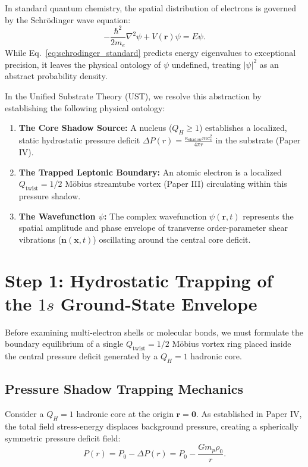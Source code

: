 \documentclass[11pt,a4paper]{article}
\begin{document}
	In standard quantum chemistry, the spatial distribution of electrons is governed by the Schrödinger wave equation:
	\begin{equation}
		-\frac{\hbar^2}{2m_e} \nabla^2 \psi + V(\mathbf{r})\psi = E\psi.
		\label{eq:schrodinger_standard}
	\end{equation}
	While Eq.\ \eqref{eq:schrodinger_standard} predicts energy eigenvalues to exceptional precision, it leaves the physical ontology of $\psi$ undefined, treating $|\psi|^2$ as an abstract probability density.
	
	In the Unified Substrate Theory (UST), we resolve this abstraction by establishing the following physical ontology:
	\begin{enumerate}
		\item \textbf{The Core Shadow Source:} A nucleus ($Q_H \ge 1$) establishes a localized, static hydrostatic pressure deficit $\Delta P(r) = \frac{\kappa_{\text{shadow}} m c_s^2}{4\pi r}$ in the substrate (Paper IV).
		\item \textbf{The Trapped Leptonic Boundary:} An atomic electron is a localized $Q_{\text{twist}} = 1/2$ Möbius streamtube vortex (Paper III) circulating within this pressure shadow.
		\item \textbf{The Wavefunction $\psi$:} The complex wavefunction $\psi(\mathbf{r}, t)$ represents the spatial amplitude and phase envelope of transverse order-parameter shear vibrations ($\mathbf{n}(\mathbf{x}, t)$) oscillating around the central core deficit.
	\end{enumerate}
	
	\section{Step 1: Hydrostatic Trapping of the $1s$ Ground-State Envelope}
	\label{sec:step1_1s_envelope}
	
	Before examining multi-electron shells or molecular bonds, we must formulate the boundary equilibrium of a single $Q_{\text{twist}} = 1/2$ Möbius vortex ring placed inside the central pressure deficit generated by a $Q_H = 1$ hadronic core.
	
	\subsection{Pressure Shadow Trapping Mechanics}
	Consider a $Q_H = 1$ hadronic core at the origin $\mathbf{r} = \mathbf{0}$. As established in Paper IV, the total field stress-energy displaces background pressure, creating a spherically symmetric pressure deficit field:
	\begin{equation}
		P(r) = P_0 - \Delta P(r) = P_0 - \frac{G m_p \rho_0}{r}.
		\label{eq:proton_pressure_deficit_field}
	\end{equation}
	
\end{document}

